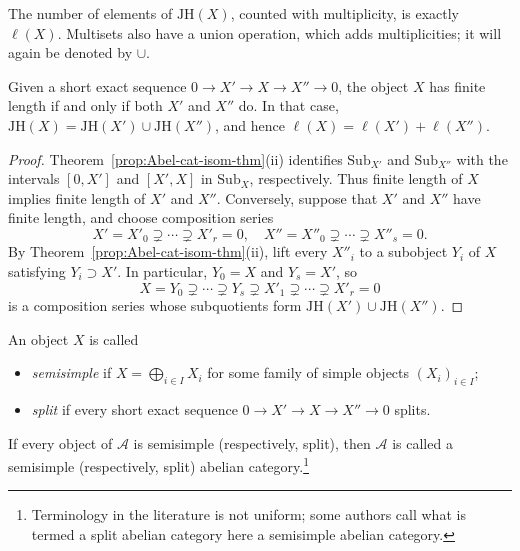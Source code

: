 The number of elements of $\mathrm{JH}(X)$, counted with multiplicity, is
exactly $\ell(X)$. Multisets also have a union operation, which adds
multiplicities; it will again be denoted by $\cup$.

\begin{lemma}
	Given a short exact sequence $0\to X'\to X\to X''\to0$, the object $X$
	has finite length if and only if both $X'$ and $X''$ do. In that case,
	$\mathrm{JH}(X)=\mathrm{JH}(X')\cup\mathrm{JH}(X'')$, and hence
	$\ell(X)=\ell(X')+\ell(X'')$.
\end{lemma}
\begin{proof}
	Theorem~\ref{prop:Abel-cat-isom-thm}(ii) identifies
	$\mathrm{Sub}_{X'}$ and $\mathrm{Sub}_{X''}$ with the intervals $[0,X']$
	and $[X',X]$ in $\mathrm{Sub}_X$, respectively. Thus finite length of $X$
	implies finite length of $X'$ and $X''$. Conversely, suppose that $X'$ and
	$X''$ have finite length, and choose composition series
	\[ X'=X'_0\supsetneq\cdots\supsetneq X'_r=0,\quad
	X''=X''_0\supsetneq\cdots\supsetneq X''_s=0. \]
	By Theorem~\ref{prop:Abel-cat-isom-thm}(ii), lift every $X''_i$ to a
	subobject $Y_i$ of $X$ satisfying $Y_i\supset X'$. In particular, $Y_0=X$ and
	$Y_s=X'$, so
	\[ X=Y_0\supsetneq\cdots\supsetneq Y_s\supsetneq X'_1\supsetneq\cdots
	\supsetneq X'_r=0 \]
	is a composition series whose subquotients form
	$\mathrm{JH}(X')\cup\mathrm{JH}(X'')$.
\end{proof}

\begin{definition}\label{def:semisimple}
	An object $X$ is called
	\begin{itemize}
		\item \emph{semisimple} if
		$X=\bigoplus_{i\in I}X_i$ for some family of simple objects
		$(X_i)_{i\in I}$;
		\item \emph{split} if every short exact sequence
		$0\to X'\to X\to X''\to0$ splits.
	\end{itemize}
	If every object of $\mathcal{A}$ is semisimple (respectively, split), then
	$\mathcal{A}$ is called a semisimple (respectively, split) abelian
	category.\footnote{Terminology in the literature is not uniform; some
	authors call what is termed a split abelian category here a semisimple
	abelian category.}
\end{definition}

